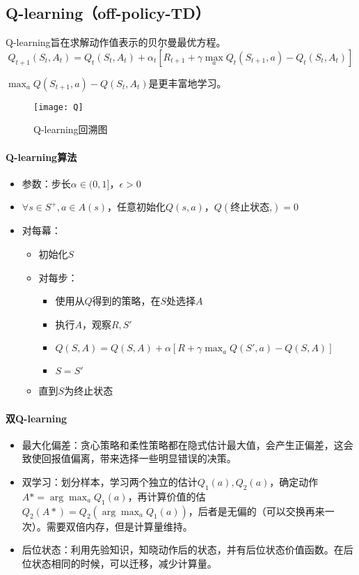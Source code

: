 \documentclass[
12pt, %
a4paper, 
oneside, %
headinclude,footinclude, %
]{scrartcl}
\begin{document}
\subsection{Q-learning（off-policy-TD）}
Q-learning旨在求解动作值表示的贝尔曼最优方程。
$$
Q_{t + 1}(S_t, A_t) = Q_t(S_t, A_t) + \alpha_t[R_{t + 1} + \gamma \max_a Q_t(S_{t + 1}, a) - Q_t(S_t, A_t)]
$$

$ \max_a Q(S_{t + 1}, a) - Q(S_t, A_t) $是更丰富地学习。

\begin{figure}[H]
\centering
\texttt{[image: Q]}
\caption[Q-learning回溯图]{Q-learning回溯图}
\end{figure}
\paragraph{Q-learning算法}
\begin{itemize}
\item 参数：步长$ \alpha \in (0,1] $，$ \epsilon > 0 $
\item $ \forall s \in S^+, a \in A(s) $，任意初始化$ Q(s,a) $，$ Q(\text{终止状态,}) = 0 $
\item 对每幕：
\begin{itemize}
\item 初始化$ S $
\item 对每步：
\begin{itemize}
\item 使用从$ Q $得到的策略，在$ S $处选择$ A $
\item 执行$ A $，观察$ R,S' $
\item $ Q(S, A) = Q(S, A) + \alpha [R + \gamma \max_a Q(S', a) - Q(S, A)] $
\item $ S = S' $
\end{itemize}
\item 直到$ S $为终止状态
\end{itemize}
\end{itemize}
\paragraph{双Q-learning}
\begin{itemize}
\item 最大化偏差：贪心策略和柔性策略都在隐式估计最大值，会产生正偏差，这会致使回报值偏离，带来选择一些明显错误的决策。
\item 双学习：划分样本，学习两个独立的估计$ Q_1(a),Q_2(a) $，确定动作$ A* = \arg \max_a Q_1(a) $，再计算价值的估$ Q_2(A*) = Q_2(\arg \max_a Q_1(a)) $，后者是无偏的（可以交换再来一次）。需要双倍内存，但是计算量维持。
\item 后位状态：利用先验知识，知晓动作后的状态，并有后位状态价值函数。在后位状态相同的时候，可以迁移，减少计算量。
\end{itemize}
\end{document}
